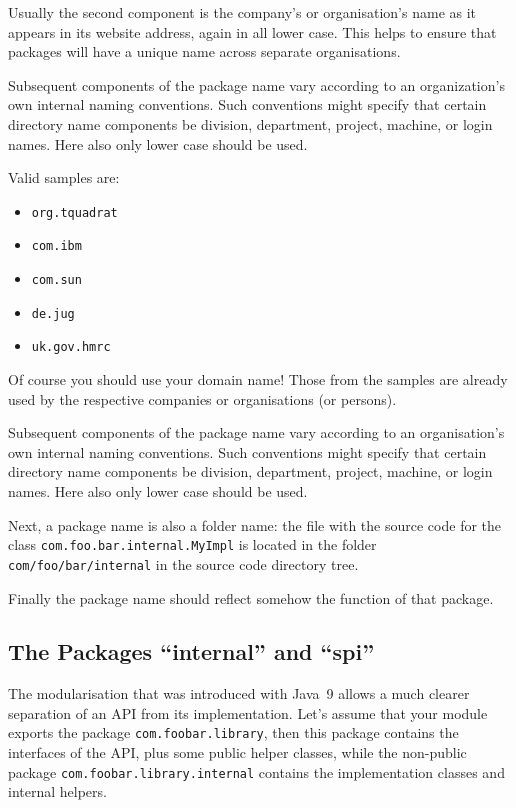 \documentclass[11pt,a4paper, titlepage, parskip=half, headsepline, footsepline, cleardoublepage=current, headheight=1cm]{scrbook}
\begin{document}
Usually the second component is the company's or organisation's name as it appears in its website address, again in all lower case. This helps to ensure that packages will have a unique name across separate organisations.

Subsequent components of the package name vary according to an organization's own internal naming conventions. Such conventions might specify that certain directory name components be division, department, project, machine, or login names. Here also only lower case should be used.

Valid samples are:
\begin{itemize}[nosep]
\item\verb#org.tquadrat#
\item\verb#com.ibm#
\item\verb#com.sun#
\item\verb#de.jug#
\item\verb#uk.gov.hmrc#
\end{itemize}

Of course you should use your domain name! Those from the samples are already used by the respective companies or organisations (or persons).

Subsequent components of the package name vary according to an organisation's own internal naming conventions. Such conventions might specify that certain directory name components be division, department, project, machine, or login names. Here also only lower case should be used.

Next, a package name is also a folder name: the file with the source code for the class \lstinline|com.foo.bar.internal.MyImpl| is located in the folder \verb#com/foo/bar/internal# in the source code directory tree.

Finally the package name should reflect somehow the function of that package.

\subsection{The Packages “internal” and “spi”}
The modularisation that was introduced with Java~9 allows a much clearer separation of an API from its implementation. Let's assume that your module exports the package \lstinline|com.foobar.library|, then this package contains the interfaces of the API, plus some public helper classes, while the non-public package \lstinline|com.foobar.library.internal| contains the implementation classes and internal helpers.
\end{document}
